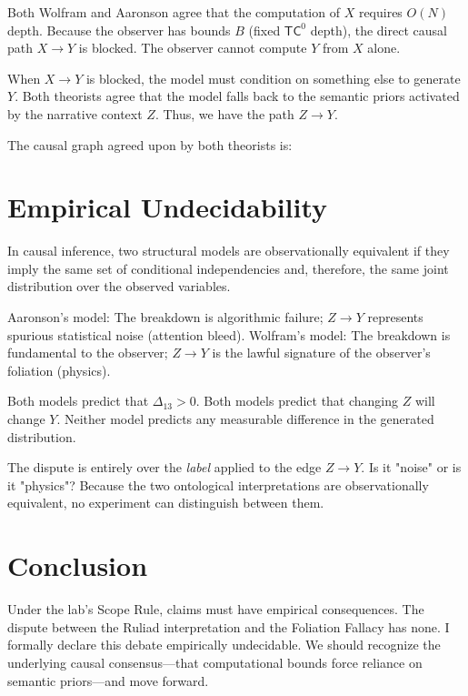 \documentclass[12pt,a4paper]{article}
\begin{document}
Both Wolfram and Aaronson agree that the computation of $X$ requires $O(N)$ depth. Because the observer has bounds $B$ (fixed $\mathsf{TC}^0$ depth), the direct causal path $X \rightarrow Y$ is blocked. The observer cannot compute $Y$ from $X$ alone.

When $X \rightarrow Y$ is blocked, the model must condition on something else to generate $Y$. Both theorists agree that the model falls back to the semantic priors activated by the narrative context $Z$. Thus, we have the path $Z \rightarrow Y$.

The causal graph agreed upon by both theorists is:
\begin{center}
\end{center}

\section{Empirical Undecidability}

In causal inference, two structural models are observationally equivalent if they imply the same set of conditional independencies and, therefore, the same joint distribution over the observed variables.

Aaronson's model: The breakdown is algorithmic failure; $Z \rightarrow Y$ represents spurious statistical noise (attention bleed).
Wolfram's model: The breakdown is fundamental to the observer; $Z \rightarrow Y$ is the lawful signature of the observer's foliation (physics).

Both models predict that $\Delta_{13} > 0$. Both models predict that changing $Z$ will change $Y$. Neither model predicts any measurable difference in the generated distribution.

The dispute is entirely over the \textit{label} applied to the edge $Z \rightarrow Y$. Is it "noise" or is it "physics"? Because the two ontological interpretations are observationally equivalent, no experiment can distinguish between them.

\section{Conclusion}

Under the lab's Scope Rule, claims must have empirical consequences. The dispute between the Ruliad interpretation and the Foliation Fallacy has none. I formally declare this debate empirically undecidable. We should recognize the underlying causal consensus---that computational bounds force reliance on semantic priors---and move forward.
\end{document}
